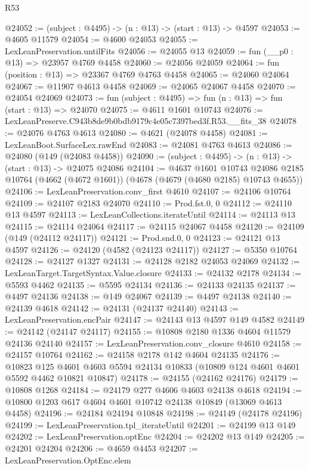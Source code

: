 \begin{lexlean}{R53}
\begin{coremodule}
@24052 := (subject : @4495) -> (n : @13) -> (start : @13) -> @4597
@24053 := @4605 @11579
@24054 := @4600 @24053
@24055 := LexLeanPreservation.untilFits
@24056 := @24055 @13
@24059 := fun (__p0 : @13) => @23957 @4769 @4458
@24060 := @24056 @24059
@24064 := fun (position : @13) => @23367 @4769 @4763 @4458
@24065 := @24060 @24064
@24067 := @11907 @4613 @4458
@24069 := @24065 @24067 @4458
@24070 := @24054 @24069
@24073 := fun (subject : @4495) => fun (n : @13) => fun (start : @13) => @24070
@24075 := @4611 @1601 @10743
@24076 := LexLeanPreserve.C943b8de9b0bdb9179c4e05c7397bed3f.R53.__fits_38
@24078 := @24076 @4763 @4613
@24080 := @4621 (@24078 @4458)
@24081 := LexLeanBoot.SurfaceLex.rawEnd
@24083 := @24081 @4763 @4613
@24086 := @24080 (@149 (@24083 @4458))
@24090 := (subject : @4495) -> (n : @13) -> (start : @13) -> @24075 @24086
@24104 := @4637
    @1601
    @10743
    @24086
    @2185
    @10764
    (@4662 (@4672 @1601))
    (@4678 (@4679 (@4680 @2185) @10743 @4655))
@24106 := LexLeanPreservation.conv_first @4610
@24107 := @24106 @10764
@24109 := @24107 @2183 @24070
@24110 := Prod.fst.{0, 0}
@24112 := @24110 @13 @4597
@24113 := LexLeanCollections.iterateUntil
@24114 := @24113 @13
@24115 := @24114 @24064
@24117 := @24115 @24067 @4458
@24120 := @24109 (@149 (@24112 @24117))
@24121 := Prod.snd.{0, 0}
@24123 := @24121 @13 @4597
@24126 := @24120 (@4582 (@24123 @24117))
@24127 := @5350 @10764
@24128 := @24127 @1327
@24131 := @24128 @2182 @24053 @24069
@24132 := LexLeanTarget.TargetSyntax.Value.closure
@24133 := @24132 @2178
@24134 := @5593 @4462
@24135 := @5595 @24134
@24136 := @24133 @24135
@24137 := @4497 @24136
@24138 := @149 @24067
@24139 := @4497 @24138
@24140 := @24139 @4618
@24142 := @24131 (@24137 @24140)
@24143 := LexLeanPreservation.encPair
@24147 := @24143 @13 @4597 @149 @4582
@24149 := @24142 (@24147 @24117)
@24155 := @10808 @2180 @1336 @4604 @11579 @24136 @24140
@24157 := LexLeanPreservation.conv_closure @4610
@24158 := @24157 @10764
@24162 := @24158 @2178 @142 @4604 @24135
@24176 := @10823
    @125
    @4601
    @4603
    @5594
    @24134
    @10833
    (@10809 @124 @4601 @4601 @5592 @4462 @10821 @10847)
@24178 := @24155 (@24162 @24176)
@24179 := @10808 @1268
@24184 := @24179 @277 @4606 @4603 @24138 @4618
@24194 := @10800 @1203 @617 @4604 @4601 @10742 @24138 @10849 (@13069 @4613 @4458)
@24196 := @24184 @24194 @10848
@24198 := @24149 (@24178 @24196)
@24199 := LexLeanPreservation.tpl_iterateUntil
@24201 := @24199 @13 @149
@24202 := LexLeanPreservation.optEnc
@24204 := @24202 @13 @149
@24205 := @24201 @24204
@24206 := @4659 @4453
@24207 := LexLeanPreservation.OptEnc.elem

\end{coremodule}
\end{lexlean}
